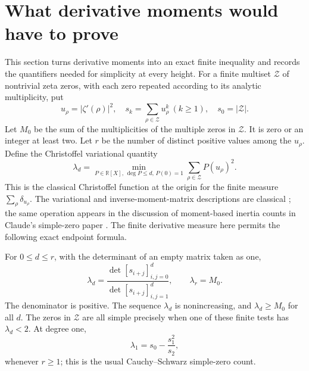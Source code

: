 \section{What derivative moments would have to prove}
\label{sec:fd-moments}
This section turns derivative moments into an exact finite inequality and records the quantifiers needed for simplicity at every height.
For a finite multiset $\mathcal Z$ of nontrivial zeta zeros, with each zero
repeated according to its analytic multiplicity, put
\[
 u_\rho=|\zeta'(\rho)|^2,\quad
 s_k=\sum_{\rho\in\mathcal Z}u_\rho^k\ (k\ge1),\quad
 s_0=|\mathcal Z|.
\]
Let $M_0$ be the sum of the multiplicities of the multiple zeros in
$\mathcal Z$.  It is zero or an integer at least two.
Let $r$ be the number of distinct positive values among the $u_\rho$.
Define the Christoffel variational quantity
\[
 \lambda_d=\min_{P\in\mathbb R[X],\,\deg P\le d,\,P(0)=1}
                  \sum_{\rho\in\mathcal Z}P(u_\rho)^2.
\]
This is the classical Christoffel function at the origin for the finite
measure $\sum_\rho\delta_{u_\rho}$.
The variational and inverse-moment-matrix descriptions are classical
\cite{LasserrePauwels2019}; the same operation appears in the discussion
of moment-based inertia counts in Claude's simple-zero paper
\cite[Section~7.5(d),(f)]{Claude2026}.
The finite derivative measure here permits the following exact endpoint formula.

\begin{proposition}
\label{prop:fd-moment}
For $0\le d\le r$, with the determinant of an empty matrix taken as one,
\[
 \lambda_d=
 \frac{\det[s_{i+j}]_{i,j=0}^{d}}
      {\det[s_{i+j}]_{i,j=1}^{d}},\qquad
 \lambda_r=M_0.
\]
The denominator is positive.  The sequence $\lambda_d$ is nonincreasing,
and $\lambda_d\ge M_0$ for all $d$.  The zeros in $\mathcal Z$ are
all simple precisely when one of these finite tests has $\lambda_d<2$.
At degree one,
\[
 \lambda_1=s_0-\frac{s_1^2}{s_2},
\]
whenever $r\ge1$; this is the usual Cauchy--Schwarz simple-zero count.
\end{proposition}


